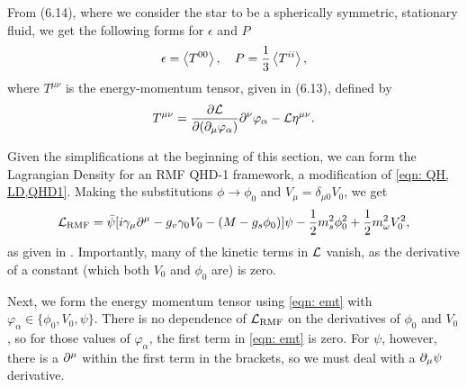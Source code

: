From \autocite[p. 40]{diener_2008} (6.14), where we consider the star to be a spherically symmetric, stationary fluid, we get the following forms for $\epsilon$ and $P$
\begin{align}\label{eqn: eps and P defs}
    \epsilon = \expval{T^{00}}, \quad P = \frac{1}{3}\expval{T^{ii}},
\end{align}
where $T^{\mu\nu}$ is the energy-momentum tensor, given in \autocite[p. 40]{diener_2008} (6.13), defined by 
\begin{align}\label{eqn: emt}
    T^{\mu\nu} = \pdv{\mathcal{L}}{(\partial_\mu \varphi_\alpha)}\partial^\nu \varphi_\alpha - \mathcal{L} \eta^{\mu\nu}.
\end{align}

Given the simplifications at the beginning of this section, we can form the Lagrangian Density for an RMF QHD-1 framework, a modification of \eqref{eqn: QH, LD,QHD1}. Making the substitutions $\phi\to \phi_0$ and $V_\mu = \delta_{\mu 0 } V_0$, we get
\begin{align}
    \Lag_\text{RMF} = \bar\psi \bqty{i\gamma_\mu\p^\mu - g_v \gamma_0 V_0 - (M-g_s\phi_0)} \psi - \frac{1}{2} m_s^2 \phi_0^2 + \frac{1}{2} m_\omega^2 V_0^2,
\end{align}
as given in \autocite{diener_2008}. Importantly, many of the kinetic terms in $\mathcal{L}$ vanish, as the derivative of a constant (which both $V_0$ and $\phi_0$ are) is zero. 

Next, we form the energy momentum tensor using \eqref{eqn: emt} with $\varphi_\alpha \in \{ \phi_0, V_0, \psi\}$. There is no dependence of $\mathcal{L}_\text{RMF}$ on the derivatives of $\phi_0$ and $V_0$, so for those values of $\varphi_\alpha$, the first term in \eqref{eqn: emt} is zero. For $\psi$, however, there is a $\partial^\mu$ within the first term in the brackets, so we must deal with a $\partial_\mu \psi$ derivative. 

